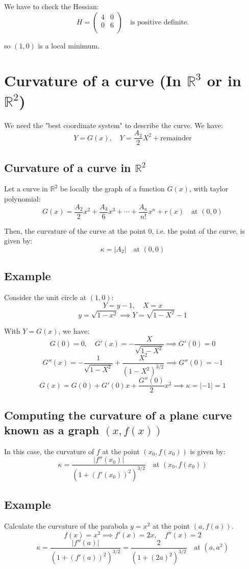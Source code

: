 \documentclass[11pt]{article}
\begin{document}
We have to check the Hessian:
\[
H = \begin{pmatrix}
    4 & 0 \\
    0 & 6 \\
\end{pmatrix} \quad \text{is positive definite.}
\]

so $(1,0)$ is a local minimum.

\section{Curvature of a curve (In $\mathbb{R}^3$ or in $\mathbb{R}^2$)}
We need the "best coordinate system" to describe the curve. We have:
\[
Y = G(x), \quad Y = \frac{A_2}{2}X^2 + \text{remainder}
\]

\subsection{Curvature of a curve in $\mathbb{R}^2$}
Let a curve in $\mathbb{R}^2$ be locally the graph of a function $G(x)$, with taylor polynomial:
\[
G(x) = \frac{A_2}{2}x^2 + \frac{A_3}{6}x^3 + \cdots + \frac{A_n}{n!}x^n + r(x) \quad \text{at } (0,0)
\]

Then, the curvature of the curve at the point 0, i.e. the point of the curve, is given by:
\[
\kappa = |A_2| \quad \text{at } (0,0)
\]

\subsection*{Example}
Consider the unit circle at $(1,0)$:
\[
Y = y - 1, \quad X = x
\]
\[
y = \sqrt{1 - x^2} \implies Y = \sqrt{1 - X^2} - 1
\]

With $Y = G(x)$, we have:
\[
G(0) = 0, \quad G'(x) = -\frac{X}{\sqrt{1 - X^2}} \implies G'(0) = 0
\]
\[
G''(x) = -\frac{1}{\sqrt{1 - X^2}} + \frac{X^2}{(1 - X^2)^{3/2}} \implies G''(0) = -1
\]
\[
G(x) = G(0) + G'(0)x + \frac{G''(0)}{2}x^2 \implies \kappa = |-1| = 1
\]

\subsection{Computing the curvature of a plane curve known as a graph $(x,f(x))$}
In this case, the curvature of $f$ at the point $(x_0,f(x_0))$ is given by:
\[
\kappa = \frac{|f''(x_0)|}{(1 + (f'(x_0))^2)^{3/2}} \quad \text{at } (x_0,f(x_0))
\]

\subsection*{Example}
Calculate the curvature of the parabola $y = x^2$ at the point $(a,f(a))$.
\[
f(x) = x^2 \implies f'(x) = 2x, \quad f''(x) = 2
\]
\[
\kappa = \frac{|f''(a)|}{(1 + (f'(a))^2)^{3/2}} = \frac{2}{(1 + (2a)^2)^{3/2}} \quad \text{at } (a,a^2)
\]
\end{document}
